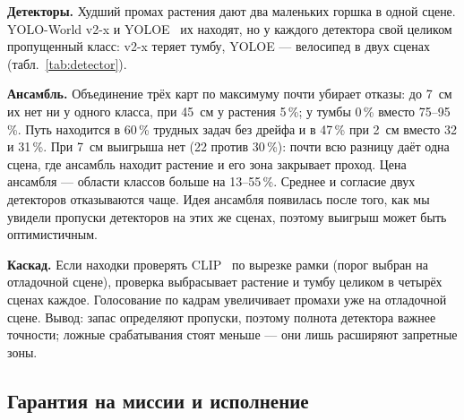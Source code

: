 \documentclass[conference,a4paper]{IEEEtran}
\theoremstyle{definition}
\begin{document}
\begin{table}[t]
\centering
\caption{Детекторы с одним словарём из 98 классов, их объединение (в клетке --- максимум, среднее или второе по величине
из трёх долей класса, то есть согласие двух) и каскад с проверкой CLIP: медианный запас совместного варианта (м) и доля
разбиений с отказом; доля трудных задач с путём и доля успешных случайных миссий.}
\label{tab:detector}
\footnotesize

\end{table}

\textbf{Детекторы.} Худший промах растения дают два маленьких горшка в одной сцене. YOLO-World v2-x и
YOLOE~\cite{yoloe} их находят, но у каждого детектора свой целиком пропущенный класс: v2-x теряет тумбу, YOLOE ---
велосипед в двух сценах (табл.~\ref{tab:detector}).

\textbf{Ансамбль.} Объединение трёх карт по максимуму почти убирает отказы: до 7~см их нет ни у одного класса, при
45~см у растения 5\,\%; у тумбы 0\,\% вместо 75--95\,\%. Путь находится в 60\,\% трудных задач без дрейфа и в 47\,\%
при 2~см вместо 32 и 31\,\%. При 7~см выигрыша нет (22 против 30\,\%): почти всю разницу даёт одна сцена, где ансамбль
находит растение и его зона закрывает проход. Цена ансамбля --- области классов больше на 13--55\,\%. Среднее и согласие
двух детекторов отказываются чаще. Идея ансамбля появилась после того, как мы увидели пропуски детекторов на этих же
сценах, поэтому выигрыш может быть оптимистичным.

\textbf{Каскад.} Если находки проверять CLIP~\cite{clip} по вырезке рамки (порог выбран на отладочной сцене), проверка
выбрасывает растение и тумбу целиком в четырёх сценах каждое. Голосование по кадрам увеличивает промахи уже на отладочной
сцене. Вывод: запас определяют пропуски, поэтому полнота детектора важнее точности; ложные срабатывания стоят меньше ---
они лишь расширяют запретные зоны.

\subsection{Гарантия на миссии и исполнение}\label{sec:crc}

\begin{table}[t]
\centering
\caption{Гарантии разной силы на одних и тех же задачах. Успех --- доля задач с путём, который не опасен и не задевает
препятствий, при точной позе, 2 и 7~см; \emph{опасн.} --- доля опасных миссий сцены: среднее по сценам / худшая сцена,
наибольшее по уровням. Совместный запас и риск пути гарантируют каждый путь, риск планировщика --- ожидаемую долю опасных
миссий в новой сцене; \emph{по исполнению} --- с учётом дрейфа во время движения.}
\label{tab:crc}
\footnotesize

\end{table}
\end{document}
